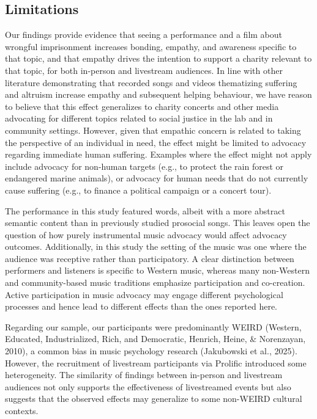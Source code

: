 \documentclass[
  man,floatsintext]{apa6}
\begin{document}
\subsection{Limitations}\label{limitations}

Our findings provide evidence that seeing a performance and a film about wrongful imprisonment increases bonding, empathy, and awareness specific to that topic, and that empathy drives the intention to support a charity relevant to that topic, for both in-person and livestream audiences. In line with other literature demonstrating that recorded songs and videos thematizing suffering and altruism increase empathy and subsequent helping behaviour, we have reason to believe that this effect generalizes to charity concerts and other media advocating for different topics related to social justice in the lab and in community settings. However, given that empathic concern is related to taking the perspective of an individual in need, the effect might be limited to advocacy regarding immediate human suffering. Examples where the effect might not apply include advocacy for non-human targets (e.g., to protect the rain forest or endangered marine animals), or advocacy for human needs that do not currently cause suffering (e.g., to finance a political campaign or a concert tour).

The performance in this study featured words, albeit with a more abstract semantic content than in previously studied prosocial songs. This leaves open the question of how purely instrumental music advocacy would affect advocacy outcomes. Additionally, in this study the setting of the music was one where the audience was receptive rather than participatory. A clear distinction between performers and listeners is specific to Western music, whereas many non-Western and community-based music traditions emphasize participation and co-creation. Active participation in music advocacy may engage different psychological processes and hence lead to different effects than the ones reported here.

Regarding our sample, our participants were predominantly WEIRD (Western, Educated, Industrialized, Rich, and Democratic, Henrich, Heine, \& Norenzayan, 2010), a common bias in music psychology research (Jakubowski et al., 2025). However, the recruitment of livestream participants via Prolific introduced some heterogeneity. The similarity of findings between in-person and livestream audiences not only supports the effectiveness of livestreamed events but also suggests that the observed effects may generalize to some non-WEIRD cultural contexts.
\end{document}
